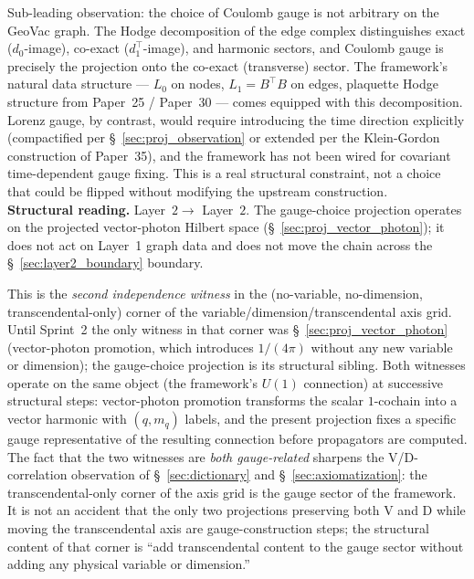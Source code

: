 Sub-leading observation: the choice of Coulomb gauge is not arbitrary
on the GeoVac graph.  The Hodge decomposition of the edge complex
distinguishes exact ($d_0$-image), co-exact ($d_1^\top$-image), and
harmonic sectors, and Coulomb gauge is precisely the projection onto
the co-exact (transverse) sector.  The framework's natural data
structure --- $L_0$ on nodes, $L_1 = B^\top B$ on edges,
plaquette Hodge structure from Paper~25 / Paper~30 --- comes equipped
with this decomposition.  Lorenz gauge, by contrast, would require
introducing the time direction explicitly (compactified per
\S~\ref{sec:proj_observation} or extended per the Klein-Gordon
construction of Paper~35), and the framework has not been wired for
covariant time-dependent gauge fixing.  This is a real structural
constraint, not a choice that could be flipped without modifying the
upstream construction.\\
\textbf{Structural reading.}  Layer~$2 \to$ Layer~$2$.  The gauge-choice
projection operates on the projected vector-photon Hilbert space
(\S~\ref{sec:proj_vector_photon}); it does not act on Layer~1 graph
data and does not move the chain across the
\S~\ref{sec:layer2_boundary} boundary.

This is the \emph{second independence witness} in the
(no-variable, no-dimension, transcendental-only) corner of the
variable/dimension/transcendental axis grid.  Until Sprint~2 the only
witness in that corner was \S~\ref{sec:proj_vector_photon} (vector-photon
promotion, which introduces $1/(4\pi)$ without any new variable or
dimension); the gauge-choice projection is its structural sibling.
Both witnesses operate on the same object (the framework's $U(1)$
connection) at successive structural steps: vector-photon promotion
transforms the scalar $1$-cochain into a vector harmonic with
$(q, m_q)$ labels, and the present projection fixes a specific gauge
representative of the resulting connection before propagators are
computed.  The fact that the two witnesses are \emph{both
gauge-related} sharpens the V/D-correlation observation of
\S~\ref{sec:dictionary} and \S~\ref{sec:axiomatization}: the
transcendental-only corner of the axis grid is the gauge sector of the
framework.  It is not an accident that the only two projections
preserving both V and D while moving the transcendental axis are
gauge-construction steps; the structural content of that corner is
``add transcendental content to the gauge sector without adding any
physical variable or dimension.''

